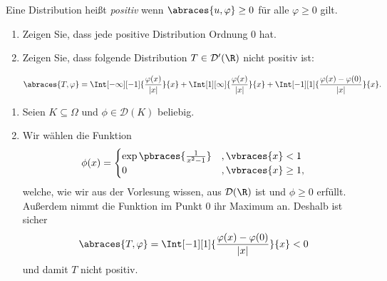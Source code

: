 
\begin{exercise}

Eine Distribution heißt \textit{positiv} wenn $\abraces{u, \varphi} \geq 0$ für alle $\varphi \geq 0$ gilt.

\begin{enumerate}[label = (\roman*)]
    \item Zeigen Sie, dass jede positive Distribution Ordnung $0$ hat.
    \item Zeigen Sie, dass folgende Distribution $T \in \mathcal{D}^\prime(\R)$ nicht positiv ist:
    
    \begin{align*}
        \abraces{T, \varphi}
        =
        \Int[-\infty][-1]
        {
            \frac{\varphi(x)}{|x|}
        }{x}
        +
        \Int[1][\infty]
        {
            \frac{\varphi(x)}{|x|}
        }{x}
        +
        \Int[-1][1]
        {
            \frac{\varphi(x) - \varphi(0)}{|x|}
        }{x}.
    \end{align*}

\end{enumerate}

\end{exercise}


\begin{solution}
\phantom{}
\begin{enumerate}[label = (\roman*)]
	\item Seien $K \subseteq \Omega$ und $\phi \in \mathcal{D}(K)$ beliebig.
	\item Wir wählen die Funktion 
	\begin{align*}
	\phi(x) =
	\begin{cases}
	\exp\pbraces{\frac{1}{x^2 - 1}} &, \vbraces{x} < 1 \\
	0 &, \vbraces{x} \geq 1,
	\end{cases}
	\end{align*}
	welche, wie wir aus der Vorlesung wissen, aus $\mathcal{D}(\R)$ ist und $\phi \geq 0$ erfüllt. Außerdem nimmt die Funktion im Punkt $0$ ihr Maximum an. Deshalb ist sicher
	\begin{align*}
	\abraces{T, \varphi} = \Int[-1][1]
	{
		\frac{\varphi(x) - \varphi(0)}{|x|}
	}{x} < 0 
	\end{align*}
	und damit $T$ nicht positiv.
\end{enumerate}

\end{solution}

